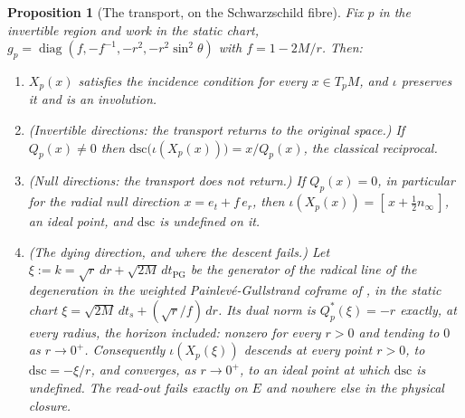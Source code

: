 \documentclass[11pt]{article}
\newtheorem{proposition}[theorem]{Proposition}
\theoremstyle{definition}
\newcommand{\er}{e_r}
\newcommand{\et}{e_t}
\newcommand{\nInf}{n_\infty}
\newcommand{\dsc}{\mathrm{dsc}}
\begin{document}
\begin{proposition}[The transport, on the Schwarzschild fibre]\label{prop:lift}
Fix $p$ in the invertible region and work in the static chart, $g_p = \operatorname{diag}(f, -f^{-1}, -r^2, -r^2\sin^2\theta)$ with $f = 1 - 2M/r$. Then:
\begin{enumerate}
\item[(1)] $X_p(x)$ satisfies the incidence condition for every $x \in T_pM$, and $\iota$ preserves it and is an involution.
\item[(2)] \emph{(Invertible directions: the transport returns to the original space.)} If $Q_p(x) \neq 0$ then $\dsc\bigl(\iota(X_p(x))\bigr) = x/Q_p(x)$, the classical reciprocal.
\item[(3)] \emph{(Null directions: the transport does not return.)} If $Q_p(x) = 0$, in particular for the radial null direction $x = \et + f\,\er$, then $\iota(X_p(x)) = [\,x + \tfrac12 \nInf\,]$, an ideal point, and $\dsc$ is undefined on it.
\item[(4)] \emph{(The dying direction, and where the descent fails.)} Let $\xi := k = \sqrt r\,dr + \sqrt{2M}\,dt_{\mathrm{PG}}$ be the generator of the radical line of the degeneration in the weighted Painlev\'e-Gullstrand coframe of \cite[Thm.~8.7]{ButlerT4}, in the static chart $\xi = \sqrt{2M}\,dt_s + (\sqrt r/f)\,dr$. Its dual norm is $Q^*_p(\xi) = -r$ exactly, at every radius, the horizon included: nonzero for every $r > 0$ and tending to $0$ as $r \to 0^+$. Consequently $\iota(X_p(\xi))$ descends at every point $r > 0$, to $\dsc = -\xi/r$, and converges, as $r \to 0^+$, to an ideal point at which $\dsc$ is undefined. The read-out fails exactly on $E$ and nowhere else in the physical closure.
\end{enumerate}
\end{proposition}
\end{document}
